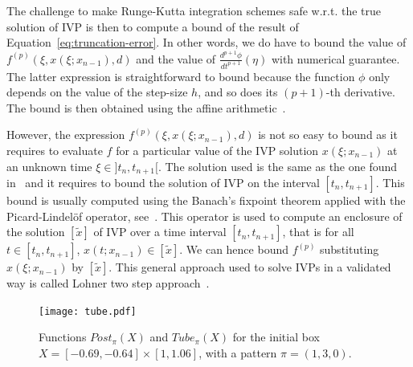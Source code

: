 The challenge to make Runge-Kutta integration schemes safe w.r.t. the
true solution of IVP is then to compute a bound of the result of
Equation~\eqref{eq:truncation-error}. In other words, we do have to
bound the value of $f^{(p)}\left(\xi, x(\xi;x_{n-1}), d\right)$ and
the value of $\frac{d^{p+1}\phi}{dt^{p+1}}(\eta)$ with numerical
guarantee. The latter expression is straightforward to bound because
the function $\phi$ only depends on the value of the step-size $h$,
and so does its $(p+1)$-th derivative. The bound is then obtained
using the affine arithmetic~\cite{AffineA97,alexandre2016validated}.

However, the expression $f^{(p)}\left(\xi, x(\xi;x_{n-1}), d\right)$
is not so easy to bound as it requires to evaluate $f$ for a
particular value of the IVP solution $x(\xi;x_{n-1})$ at an unknown
time $\xi \in ]t_n, t_{n+1}[$. The solution used is the same as the
one found in~\cite{Nedialkov,BM06} and it requires to bound the
solution of IVP on the interval $[t_n, t_{n+1}]$. This bound is
usually computed using the Banach's fixpoint theorem applied with the
Picard-Lindel\"of operator, see~\cite{Nedialkov}. This operator is
used to compute an enclosure of the solution $[\tilde{x}]$ of IVP over
a time interval $[t_n, t_{n+1}]$, that is for all $t \in [t_n,
t_{n+1}]$, $x(t; x_{n-1}) \in [\tilde{x}]$. We can hence bound
$f^{(p)}$ substituting $x(\xi;x_{n-1})$ by $[\tilde{x}]$. This general
approach used to solve IVPs in a validated way is called Lohner two
step approach~\cite{Lohner87}.

\begin{figure}[t]
 \centering
 \texttt{[image: tube.pdf]}
 \caption{Functions $Post_{\pi}(X)$ and $Tube_{\pi}(X)$ for the
   initial box $X=[-0.69,-0.64] \times [1,1.06]$, with a pattern $\pi
   = (1,3,0)$.}
 \label{fig:post_tube}
\end{figure}

